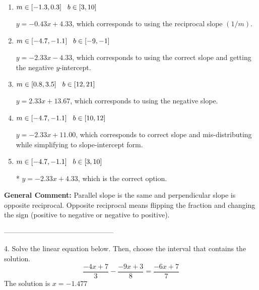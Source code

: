 \documentclass{extbook}[14pt]
\begin{document}
\begin{enumerate}[label=\Alph*.] 
\item $ m \in [-1.3, 0.3] \hspace*{3mm} b \in [3, 10] $ 

  $y = -0.43x + 4.33$, which corresponds to using the reciprocal slope $(1/m)$. 
\item $ m \in [-4.7, -1.1] \hspace*{3mm} b \in [-9, -1] $ 

  $y = -2.33x - 4.33$, which corresponds to using the correct slope and getting the negative $y$-intercept. 
\item $ m \in [0.8, 3.5] \hspace*{3mm} b \in [12, 21] $ 

  $y = 2.33x + 13.67$, which corresponds to using the negative slope. 
\item $ m \in [-4.7, -1.1] \hspace*{3mm} b \in [10, 12] $ 

  $y = -2.33x + 11.00$, which corresponds to correct slope and mis-distributing while simplifying to slope-intercept form. 
\item $ m \in [-4.7, -1.1] \hspace*{3mm} b \in [3, 10] $ 

 * $y = -2.33x + 4.33$, which is the correct option. 
\end{enumerate} 
 
\textbf{General Comment:} Parallel slope is the same and perpendicular slope is opposite reciprocal. Opposite reciprocal means flipping the fraction and changing the sign (positive to negative or negative to positive). 

-----------------------------------------------

4. Solve the linear equation below. Then, choose the interval that contains the solution.
\[ \frac{-4x + 7}{3} - \frac{-9x + 3}{8} = \frac{-6x + 7}{7} \] 
The solution is $ x = -1.477 $ 
\end{document}
